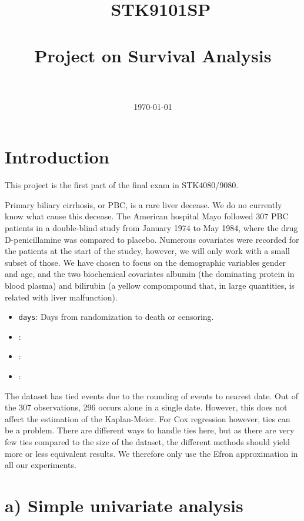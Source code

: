 \documentclass[11pt,a4paper]{article}
\title{\
\normalfont \normalsize 
\textsc{STK9101SP} \\ [25pt] %
\horrule{0.5pt} \\[0.4cm] %
\huge Project on Survival Analysis \\ %
\horrule{2pt} \\[0.5cm] %
}
\author{\AuthorName} %
\date{\normalsize\today} %
\begin{document}
\maketitle
%
\section{Introduction}
This project is the first part of the final exam in STK4080/9080.

Primary biliary cirrhosis, or PBC, is a rare liver decease. We do no currently know what cause this decease.  
The American hospital Mayo followed 307 PBC patients in a double-blind study from January 1974 to May 1984, where the drug D-penicillamine was compared to placebo.
Numerous covariates were recorded for the patients at the start of the studey, however, we will only work with a small subset of those.
We have chosen to focus on the demographic variables gender and age, and the two biochemical covariates albumin (the dominating protein in blood plasma) and bilirubin (a yellow compompound that, in large quantities, is related with liver malfunction).

\begin{itemize}
    \item \verb+days+: Days from randomization to death or censoring. 
    \item \verb++: 
    \item \verb++: 
    \item \verb++: 
\end{itemize}

The dataset has tied events due to the rounding of events to nearest date. Out of the 307 observations, 296 occurs alone in a single date. However, this does not affect the estimation of the Kaplan-Meier. 
For Cox regression however, ties can be a problem. There are different ways to handle ties here, but as there are very few ties compared to the size of the dataset, the different methods should yield more or less equivalent results. We therefore only use the Efron approximation in all our experiments.


\section{a) Simple univariate analysis}
\end{document}
